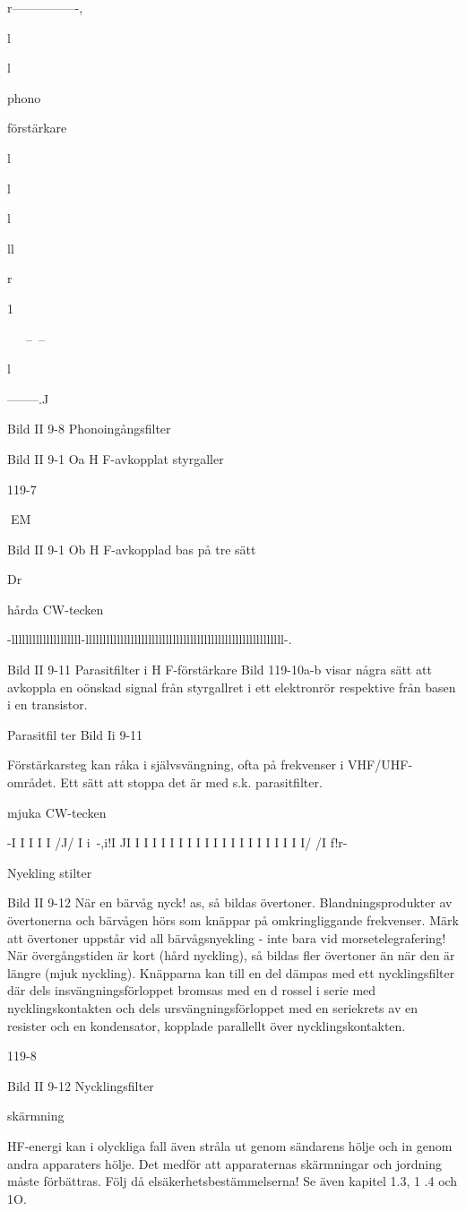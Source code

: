 r----------------,

l

l

phono

förstärkare

l

l

l

ll

r

1

~~~--~--~~~

l

--------.J

Bild II 9-8 Phonoingångsfilter

Bild II 9-1 Oa H F-avkopplat styrgaller

119-7

EM

Bild II 9-1 Ob H F-avkopplad bas på tre sätt

Dr

hårda CW-tecken

-llllllllllllllllllll-lllllllllllllllllllllllllllllllllllllllllllllllllllllllll-.

Bild II 9-11 Parasitfilter i H F-förstärkare
Bild 119-10a-b visar några sätt att avkoppla
en oönskad signal från styrgallret i ett elektronrör respektive från basen i en transistor.

Parasitfil ter
Bild Ii 9-11

Förstärkarsteg kan råka i självsvängning,
ofta på frekvenser i VHF/UHF-området. Ett
sätt att stoppa det är med s.k. parasitfilter.

mjuka CW-tecken

-I I I I I /J/ I i~-,i!I JI I I I I I I I I I I I I I I I I I I I I/ /I f!r-

Nyekling stilter

Bild II 9-12
När en bärvåg nyck! as, så bildas övertoner.
Blandningsprodukter av övertonerna och
bärvågen hörs som knäppar på omkringliggande frekvenser. Märk att övertoner uppstår vid all bärvågsnyekling - inte bara vid
morsetelegrafering!
När övergångstiden är kort (hård nyckling), så bildas fler övertoner än när den är
längre (mjuk nyckling). Knäpparna kan till en
del dämpas med ett nycklingsfilter där dels
insvängningsförloppet bromsas med en d rossel i serie med nycklingskontakten och dels
ursvängningsförloppet med en seriekrets av
en resister och en kondensator, kopplade
parallellt över nycklingskontakten.

119-8

Bild II 9-12 Nycklingsfilter

skärmning

HF-energi kan i olyckliga fall även stråla ut
genom sändarens hölje och in genom andra
apparaters hölje. Det medför att apparaternas skärmningar och jordning måste förbättras. Följ då elsäkerhetsbestämmelserna!
Se även kapitel 1.3, 1 .4 och 1O.
